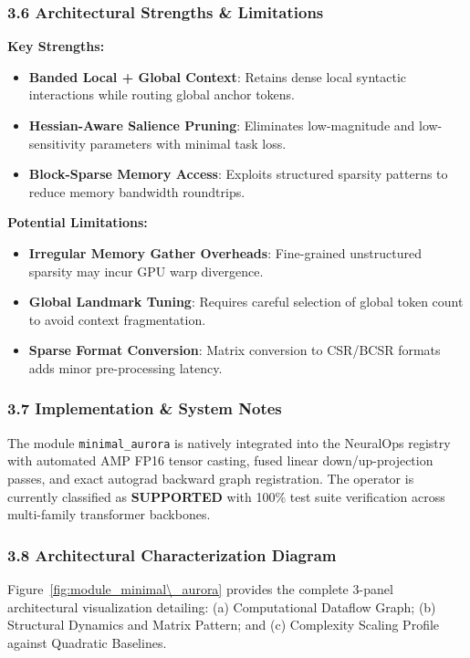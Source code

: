 \subsubsection*{3.6 Architectural Strengths \& Limitations}
\textbf{Key Strengths:}
\begin{itemize}
    \item \textbf{Banded Local + Global Context}: Retains dense local syntactic interactions while routing global anchor tokens.
    \item \textbf{Hessian-Aware Salience Pruning}: Eliminates low-magnitude and low-sensitivity parameters with minimal task loss.
    \item \textbf{Block-Sparse Memory Access}: Exploits structured sparsity patterns to reduce memory bandwidth roundtrips.
\end{itemize}

\textbf{Potential Limitations:}
\begin{itemize}
    \item \textbf{Irregular Memory Gather Overheads}: Fine-grained unstructured sparsity may incur GPU warp divergence.
    \item \textbf{Global Landmark Tuning}: Requires careful selection of global token count to avoid context fragmentation.
    \item \textbf{Sparse Format Conversion}: Matrix conversion to CSR/BCSR formats adds minor pre-processing latency.
\end{itemize}

\subsubsection*{3.7 Implementation \& System Notes}
The module \texttt{minimal\_aurora} is natively integrated into the NeuralOps registry with automated AMP FP16 tensor casting, fused linear down/up-projection passes, and exact autograd backward graph registration. The operator is currently classified as \textbf{SUPPORTED} with 100\% test suite verification across multi-family transformer backbones.

\subsubsection*{3.8 Architectural Characterization Diagram}
Figure~\ref{fig:module_minimal\_aurora} provides the complete 3-panel architectural visualization detailing: (a) Computational Dataflow Graph; (b) Structural Dynamics and Matrix Pattern; and (c) Complexity Scaling Profile against Quadratic Baselines.


